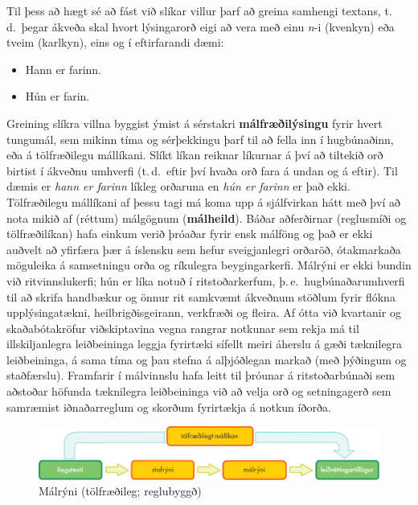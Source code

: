 \begin{multicols}{2}
Til þess að hægt sé að fást við slíkar villur þarf að greina samhengi textans, t.\,d.~þegar ákveða skal hvort lýsingarorð eigi að vera með einu \textit{n}-i (kvenkyn) eða tveim (karlkyn), eins og í eftirfarandi dæmi:

\begin{itemize}
\item Hann er farinn.
\item Hún er farin.
\end{itemize}

Greining slíkra villna byggist ýmist á sérstakri \textbf{málfræðilýsingu} fyrir hvert tungumál, sem mikinn tíma og sérþekkingu þarf til að fella inn í hugbúnaðinn, eða á tölfræðilegu mállíkani. Slíkt líkan reiknar líkurnar á því að tiltekið orð birtist í ákveðnu umhverfi (t.\,d.~eftir því hvaða orð fara á undan og á eftir). Til dæmis er \textit{hann er farinn} líkleg orðaruna en \textit{hún er farinn} er það ekki. Tölfræðilegu mállíkani af þessu tagi má koma upp á sjálfvirkan hátt með því að nota mikið af (réttum) málgögnum (\textbf{málheild}). Báðar aðferðirnar (reglusmíði og tölfræðilíkan) hafa einkum verið þróaðar fyrir ensk málföng og það er ekki auðvelt að yfirfæra þær á íslensku sem hefur sveigjanlegri orðaröð, ótakmarkaða möguleika á samsetningu orða og ríkulegra beygingarkerfi. 
Málrýni er ekki bundin við ritvinnslukerfi; hún er líka notuð í ritstoðarkerfum, þ.\,e.~hugbúnaðarumhverfi til að skrifa handbækur og önnur rit samkvæmt ákveðnum stöðlum fyrir flókna upplýsingatækni, heilbrigðisgeirann, verkfræði og fleira. Af ótta við kvartanir og skaðabótakröfur viðskiptavina vegna rangrar notkunar sem rekja má til illskiljanlegra leiðbeininga leggja fyrirtæki sífellt meiri áherslu á gæði tæknilegra leiðbeininga, á sama tíma og þau stefna á alþjóðlegan markað (með þýðingum og staðfærslu). Framfarir í málvinnslu hafa leitt til þróunar á ritstoðarbúnaði sem aðstoðar höfunda tæknilegra leiðbeininga við að velja orð og setningagerð sem samræmist iðnaðarreglum og skorðum fyrirtækja á notkun íðorða.

\begin{figure}[htb]
  \center
  \includegraphics[width=\textwidth]{../_media/icelandic/language_checking}
  \caption{Málrýni (tölfræðileg; reglubyggð)}
  \label{fig:langcheckingaarch_is}
\end{figure}


\end{multicols}

